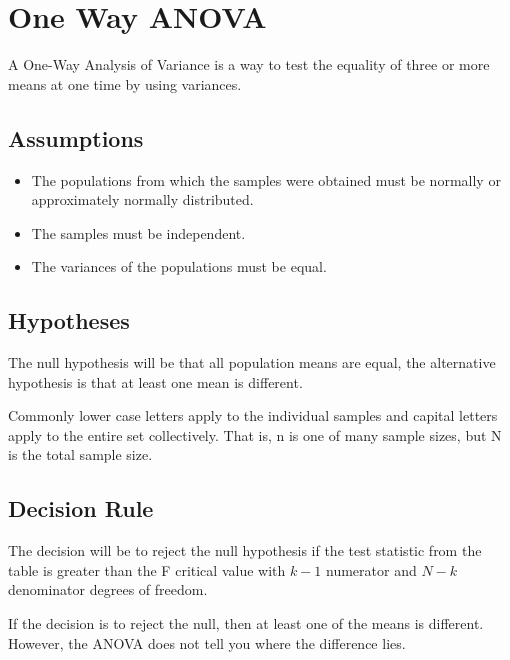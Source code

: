 \section{One Way ANOVA}

A One-Way Analysis of Variance is a way to test the equality of three or more means at one time by using variances.

\subsection{Assumptions}
\begin{itemize}\item The populations from which the samples were obtained must be normally or approximately normally distributed.
\item The samples must be independent.
\item The variances of the populations must be equal.
\end{itemize}
\subsection{Hypotheses}
The null hypothesis will be that all population means are equal, the alternative hypothesis is that at least one mean is different.

 Commonly lower case letters apply to the individual samples and capital letters apply to the entire set collectively. That is, n is one of many sample sizes, but N is the total sample size.

\subsection{Decision Rule}
The decision will be to reject the null hypothesis if the test statistic from the table is greater than the F critical value with $k-1$ numerator and $N-k$ denominator degrees of freedom.

If the decision is to reject the null, then at least one of the means is different. However, the ANOVA does not tell you where the difference lies.


\newpage
